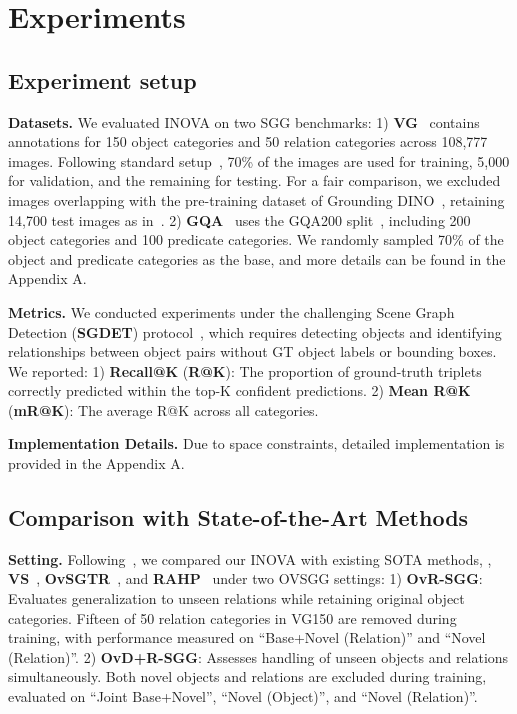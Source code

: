\section{Experiments}
\subsection{Experiment setup}
\textbf{Datasets.} We evaluated INOVA on two SGG benchmarks: 1) \textbf{VG}~\cite{krishna2017visual} contains annotations for 150 object categories and 50 relation categories across 108,777 images. Following standard setup~\cite{xu2017scene}, 70\% of the images are used for training, 5,000 for validation, and the remaining for testing. For a fair comparison, we excluded images overlapping with the pre-training dataset of Grounding DINO~\cite{liu2023grounding}, retaining 14,700 test images as in~\cite{zhang2023learning}. $\!$2) \textbf{GQA}~\cite{hudson2019gqa} uses the GQA200 split~\cite{dong2022stacked, sudhakaran2023vision}, including 200 object categories and 100 predicate categories. We randomly sampled 70\% of the object and predicate categories as the base, and more details can be found in the Appendix A.

\textbf{Metrics.} We conducted experiments under the challenging Scene Graph Detection (\textbf{SGDET}) protocol~\cite{xu2017scene,krishna2017visual}, which requires detecting objects and identifying relationships between object pairs without GT object labels or bounding boxes. We reported: 1) \textbf{Recall@K} (\textbf{R@K}): The proportion of ground-truth triplets correctly predicted within the top-K confident predictions.
2) \textbf{Mean R@K} (\textbf{mR@K}): The average R@K across all categories.


\textbf{Implementation Details.}
Due to space constraints, detailed implementation is provided in the Appendix A.
\subsection{Comparison with State-of-the-Art Methods}
\textbf{Setting.} Following~\cite{chen2024expanding}, we compared our INOVA with existing SOTA methods, \ie, \textbf{VS}~\cite{zhang2023learning}, \textbf{OvSGTR}~\cite{chen2024expanding}, and \textbf{RAHP}~\cite{liu2025relation} under two OVSGG settings: 1) \textbf{OvR-SGG}: Evaluates generalization to unseen relations while retaining original object categories. Fifteen of 50 relation categories in VG150 are removed during training, with performance measured on ``Base+Novel (Relation)'' and ``Novel (Relation)''.
2) \textbf{OvD+R-SGG}: Assesses handling of unseen objects and relations simultaneously. Both novel objects and relations are excluded during training, evaluated on ``Joint Base+Novel'', ``Novel (Object)'', and ``Novel (Relation)''. 

